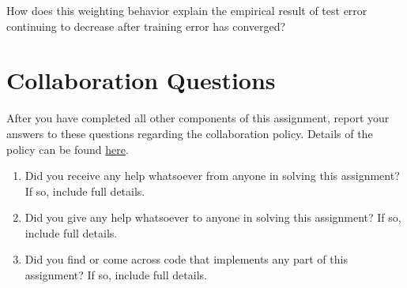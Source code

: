 \documentclass[11pt,addpoints,answers]{exam}
\begin{document}
\begin{questions}
\begin{parts}
\begin{subparts}
\subpart[2] How does this weighting behavior explain the empirical result of test error continuing to decrease after training error has converged?

 \begin{your_solution}[height=4.5cm, width=.95\textwidth]
    \end{your_solution}

\end{subparts}

\end{parts}


\end{questions}

\newpage
\newpage
\section{Collaboration Questions}
After you have completed all other components of this assignment, report your answers to these questions regarding the collaboration policy. Details of the policy can be found \href{https://www.cs.cmu.edu/~hchai2/courses/10601/#Syllabus}{here}.
\begin{enumerate}
    \item Did you receive any help whatsoever from anyone in solving this assignment? If so, include full details.
    \item Did you give any help whatsoever to anyone in solving this assignment? If so, include full details.
    \item Did you find or come across code that implements any part of this assignment? If so, include full details.
\end{enumerate}

\begin{your_solution}[height=6cm]

\end{your_solution}
\end{document}
